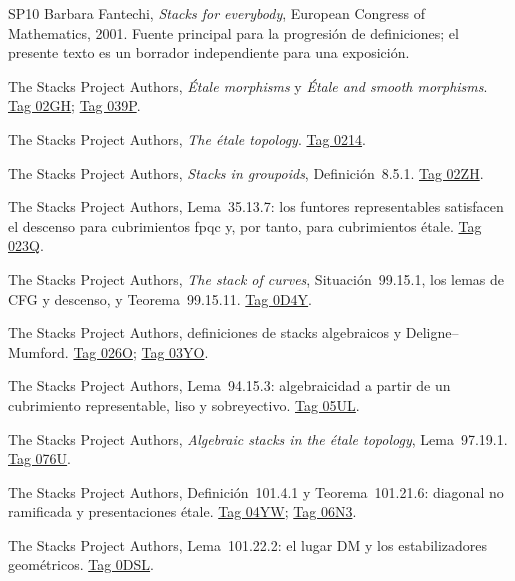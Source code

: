 \documentclass[12pt,openany]{memoir}
\begin{document}
\begin{thebibliography}{SP10}
Barbara Fantechi, \emph{Stacks for everybody}, European Congress of
Mathematics, 2001. Fuente principal para la progresión de definiciones;
el presente texto es un borrador independiente para una exposición.

The Stacks Project Authors, \emph{\'Etale morphisms} y
\emph{\'Etale and smooth morphisms}.
\href{https://stacks.math.columbia.edu/tag/02GH}{Tag 02GH};
\href{https://stacks.math.columbia.edu/tag/039P}{Tag 039P}.

The Stacks Project Authors, \emph{The \'etale topology}.
\href{https://stacks.math.columbia.edu/tag/0214}{Tag 0214}.

The Stacks Project Authors, \emph{Stacks in groupoids}, Definición~8.5.1.
\href{https://stacks.math.columbia.edu/tag/02ZH}{Tag 02ZH}.

The Stacks Project Authors, Lema~35.13.7: los funtores representables
satisfacen el descenso para cubrimientos fpqc y, por tanto, para
cubrimientos étale.
\href{https://stacks.math.columbia.edu/tag/023Q}{Tag 023Q}.

The Stacks Project Authors, \emph{The stack of curves},
Situación~99.15.1, los lemas de CFG y descenso, y Teorema~99.15.11.
\href{https://stacks.math.columbia.edu/tag/0D4Y}{Tag 0D4Y}.

The Stacks Project Authors, definiciones de stacks algebraicos y
Deligne--Mumford.
\href{https://stacks.math.columbia.edu/tag/026O}{Tag 026O};
\href{https://stacks.math.columbia.edu/tag/03YO}{Tag 03YO}.

The Stacks Project Authors, Lema~94.15.3: algebraicidad a partir de un
cubrimiento representable, liso y sobreyectivo.
\href{https://stacks.math.columbia.edu/tag/05UL}{Tag 05UL}.

The Stacks Project Authors, \emph{Algebraic stacks in the \'etale topology},
Lema~97.19.1.
\href{https://stacks.math.columbia.edu/tag/076U}{Tag 076U}.

The Stacks Project Authors, Definición~101.4.1 y Teorema~101.21.6:
diagonal no ramificada y presentaciones étale.
\href{https://stacks.math.columbia.edu/tag/04YW}{Tag 04YW};
\href{https://stacks.math.columbia.edu/tag/06N3}{Tag 06N3}.

The Stacks Project Authors, Lema~101.22.2: el lugar DM y los
estabilizadores geométricos.
\href{https://stacks.math.columbia.edu/tag/0DSL}{Tag 0DSL}.


\end{thebibliography}
\end{document}
